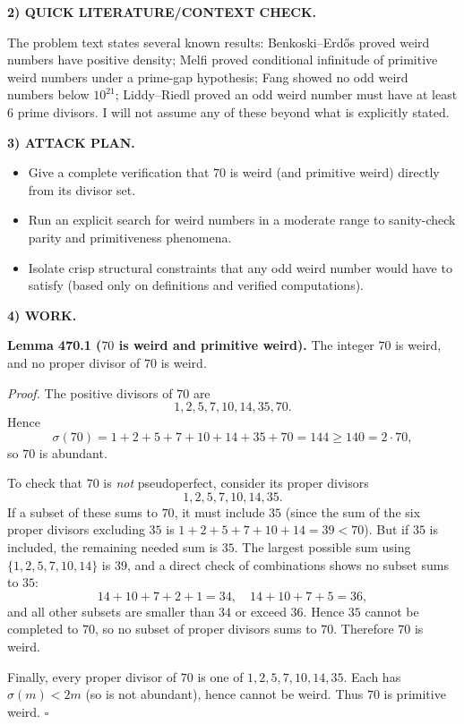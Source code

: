 \medskip
\noindent\textbf{2) QUICK LITERATURE/CONTEXT CHECK.}

The problem text states several known results: Benkoski--Erd\H{o}s \cite{BeEr74} proved weird numbers have positive density; Melfi \cite{Me15} proved conditional infinitude of primitive weird numbers under a prime-gap hypothesis; Fang \cite{Fa22} showed no odd weird numbers below $10^{21}$; Liddy--Riedl \cite{LiRi18} proved an odd weird number must have at least 6 prime divisors. I will not assume any of these beyond what is explicitly stated.

\medskip
\noindent\textbf{3) ATTACK PLAN.}

\begin{itemize}
\item Give a complete verification that $70$ is weird (and primitive weird) directly from its divisor set.
\item Run an explicit search for weird numbers in a moderate range to sanity-check parity and primitiveness phenomena.
\item Isolate crisp structural constraints that any odd weird number would have to satisfy (based only on definitions and verified computations).
\end{itemize}

\medskip
\noindent\textbf{4) WORK.}

\noindent\textbf{Lemma 470.1 ($70$ is weird and primitive weird).}
The integer $70$ is weird, and no proper divisor of $70$ is weird.

\textit{Proof.}
The positive divisors of $70$ are
\[
1,2,5,7,10,14,35,70.
\]
Hence
\[
\sigma(70)=1+2+5+7+10+14+35+70=144\ge 140=2\cdot 70,
\]
so $70$ is abundant.

To check that $70$ is \emph{not} pseudoperfect, consider its proper divisors
\[
1,2,5,7,10,14,35.
\]
If a subset of these sums to $70$, it must include $35$ (since the sum of the six proper divisors excluding $35$ is $1+2+5+7+10+14=39<70$). But if $35$ is included, the remaining needed sum is $35$. The largest possible sum using $\{1,2,5,7,10,14\}$ is $39$, and a direct check of combinations shows no subset sums to $35$:
\[
14+10+7+2+1=34,\quad 14+10+7+5=36,
\]
and all other subsets are smaller than $34$ or exceed $36$. Hence $35$ cannot be completed to $70$, so no subset of proper divisors sums to $70$. Therefore $70$ is weird.

Finally, every proper divisor of $70$ is one of $1,2,5,7,10,14,35$. Each has $\sigma(m)<2m$ (so is not abundant), hence cannot be weird. Thus $70$ is primitive weird. \hfill$\square$

